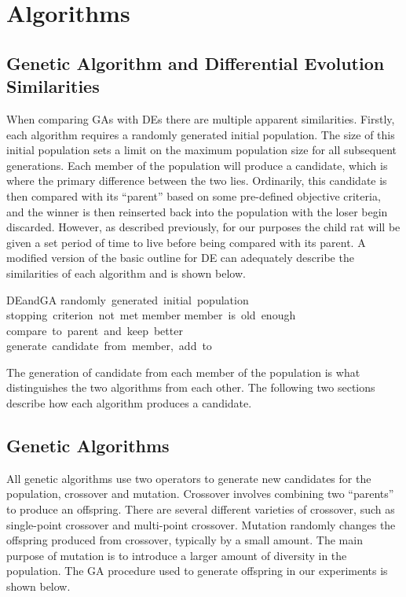 \documentclass{sig-alternate}
\begin{document}
\section{Algorithms}

\subsection{Genetic Algorithm and Differential Evolution Similarities}
When comparing GAs with DEs there are multiple apparent similarities.  Firstly, each algorithm requires a randomly generated initial population.  The size of this initial population sets a limit on the maximum population size for all subsequent generations.  Each member of the population will produce a candidate, which is where the primary difference between the two lies.  Ordinarily, this candidate is then compared with its ``parent'' based on some pre-defined objective criteria, and the winner is then reinserted back into the population with the loser begin discarded.  However, as described previously, for our purposes the child rat will be given a set period of time to live before being compared with its parent.  A modified version of the basic outline for DE can adequately describe the similarities of each algorithm and is shown below.\cite{DEMO}

\begin{pseudocode}{DEandGA}{ }
 \GETS \mbox{randomly generated initial population}\\
\WHILE \mbox{stopping criterion not met} \DO
\BEGIN
\FOREACH member \in {} \DO
\BEGIN
\IF \mbox{member is old enough}
\THEN \mbox{compare to parent and keep better}\\
\mbox{generate candidate from member, add to } 
\END
\END
\end{pseudocode}

The generation of candidate from each member of the population is what distinguishes the two algorithms from each other.  The following two sections describe how each algorithm produces a candidate.
\subsection{Genetic Algorithms}
All genetic algorithms use two operators to generate new candidates for the population, crossover and mutation.\cite{Konak:GA}  Crossover involves combining two ``parents'' to produce an offspring.  There are several different varieties of crossover, such as single-point crossover and multi-point crossover.  Mutation randomly changes the offspring produced from crossover, typically by a small amount.  The main purpose of mutation is to introduce a larger amount of diversity in the population.  The GA procedure used to generate offspring in our experiments is shown below.\cite{Konak:GA}
\end{document}
